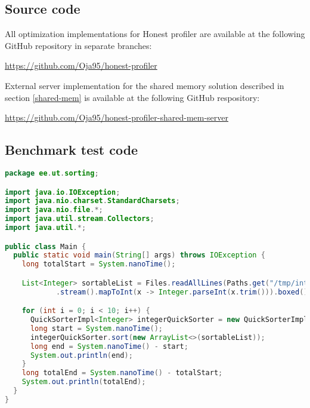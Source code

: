 \documentclass[..thesis.tex]{subfiles}
\begin{document}
\subsection{Source code}
\label{B:source-code}
All optimization implementations for Honest profiler are available at the following GitHub repository in separate branches:

\url{https://github.com/Oja95/honest-profiler}

External server implementation for the shared memory solution described in section \ref{shared-mem} is available at the following GitHub respository:

\url{https://github.com/Oja95/honest-profiler-shared-mem-server}

\subsection{Benchmark test code}
\label{B:benchmark-test-code}

\begin{lstlisting}[language=Java,style=def]
package ee.ut.sorting;

import java.io.IOException;
import java.nio.charset.StandardCharsets;
import java.nio.file.*;
import java.util.stream.Collectors;
import java.util.*;

public class Main {
  public static void main(String[] args) throws IOException {
    long totalStart = System.nanoTime();

    List<Integer> sortableList = Files.readAllLines(Paths.get("/tmp/integers.data"), StandardCharsets.UTF_8)
            .stream().mapToInt(x -> Integer.parseInt(x.trim())).boxed().collect(Collectors.toList());

    for (int i = 0; i < 10; i++) {
      QuickSorterImpl<Integer> integerQuickSorter = new QuickSorterImpl<>();
      long start = System.nanoTime();
      integerQuickSorter.sort(new ArrayList<>(sortableList));
      long end = System.nanoTime() - start;
      System.out.println(end);
    }
    long totalEnd = System.nanoTime() - totalStart;
    System.out.println(totalEnd);
  }
}

\end{lstlisting}

\newpage
\end{document}

